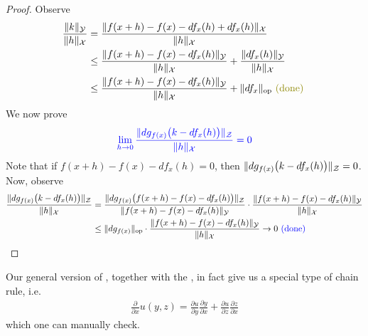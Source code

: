 \documentclass{report}
\begin{document}
\begin{proof}
Observe 
\begin{align*}
\frac{\norm{k}_\mathcal{Y}}{\norm{h}_\mathcal{X}}&= \frac{\norm{f(x+h)-f(x)-df_x(h)+df_x(h)}_\mathcal{X}}{\norm{h}_\mathcal{X}}\\
&\leq \frac{\norm{f(x+h)-f(x)-df_x(h)}_\mathcal{Y}}{\norm{h}_\mathcal{X}}+\frac{\norm{df_x(h)}_\mathcal{Y}}{\norm{h}_\mathcal{X}}\\
&\leq \frac{\norm{f(x+h)-f(x)-df_x(h)}_\mathcal{Y}}{\norm{h}_\mathcal{X}} + \norm{df_x}_\text{op} \odone
\end{align*}
We now prove 
\begin{align*}
\textcolor{blue}{\lim_{h\to 0} \frac{\| dg_{f(x)}\big(k-df_x(h) \big) \|_\mathcal{Z}}{\| h \|_\mathcal{X}}=0}
\end{align*}
Note that if $f(x+h)-f(x)-df_x(h)=0$, then $\| dg_{f(x)}\big(k-df_x(h) \big) \|_\mathcal{Z}=0$. Now, observe 
\begin{align*}
\frac{\| dg_{f(x)}\big(k-df_x(h) \big) \|_\mathcal{Z}}{\| h \|_\mathcal{X}}&= \frac{\| dg_{f(x)}\big(f(x+h)-f(x)-df_x(h) \big) \|_\mathcal{Z}}{\| f(x+h)-f(x)-df_x(h) \|_\mathcal{Y}}\cdot \frac{\| f(x+h)-f(x)-df_x(h) \|_\mathcal{Y}}{\| h \|_\mathcal{X}}\\
&\leq \| dg_{f(x)} \|_\text{op}\cdot \frac{\| f(x+h)-f(x)-df_x(h) \|_\mathcal{Y}}{\| h \|_\mathcal{X}}\to 0 \textcolor{blue}{\text{ (done) }}
\end{align*}
\end{proof}
\begin{mdframed}
Our general version of , together with the , in fact give us a special type of chain rule, i.e. 
\begin{align*}
  \frac{\partial }{\partial x}u(y,z)= \frac{\partial u}{\partial y}\frac{\partial y}{\partial x}+ \frac{\partial u}{\partial z}\frac{ \partial z}{\partial x}
\end{align*}
which one can manually check. 
\end{mdframed}
\end{document}
